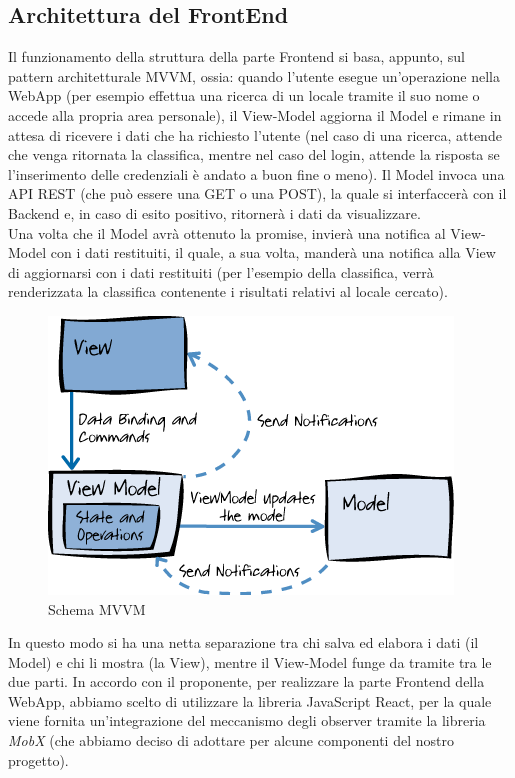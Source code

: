 \subsection{Architettura del FrontEnd}

Il funzionamento della struttura della parte Frontend si basa, appunto, sul pattern architetturale MVVM, ossia: quando l’utente esegue un’operazione nella WebApp (per esempio effettua una ricerca di un locale tramite il suo nome o accede alla propria area personale), il View-Model aggiorna il Model e rimane in attesa di ricevere i dati che ha richiesto l’utente (nel caso di una ricerca, attende che venga ritornata la classifica, mentre nel caso del login, attende la risposta se l’inserimento delle credenziali è andato a buon fine o meno). Il Model invoca una API REST (che può essere una GET o una POST), la quale si interfaccerà con il Backend e, in caso di esito positivo, ritornerà i dati da visualizzare. \\
Una volta che il Model avrà ottenuto la promise, invierà una notifica al View-Model con i dati restituiti, il quale, a sua volta, manderà una notifica alla View di aggiornarsi con i dati restituiti (per l’esempio della classifica, verrà renderizzata la classifica contenente i risultati relativi al locale cercato).

\begin{figure}[H]
    \centering
    \includegraphics[scale=0.5]{Contenuto/Immagini/MVVM.png}
    \caption{Schema MVVM}
\end{figure}

In questo modo si ha una netta separazione tra chi salva ed elabora i dati (il Model) e chi li mostra (la View), mentre il View-Model funge da tramite tra le due parti. 
In accordo con il proponente, per realizzare la parte Frontend della WebApp, abbiamo scelto di utilizzare la libreria JavaScript React, per la quale viene fornita un'integrazione del meccanismo degli observer tramite la libreria \textit{MobX} (che abbiamo deciso di adottare per alcune componenti del nostro progetto).

